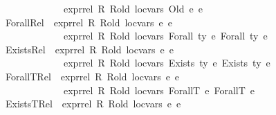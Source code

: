 \begin{isabellebody}
\ \ \ \ \ \ \ \ \ \ \ \ \ \ expr{\isacharunderscore}{\kern0pt}rel\ R\ R{\isacharunderscore}{\kern0pt}old\ loc{\isacharunderscore}{\kern0pt}vars\ {\isacharparenleft}{\kern0pt}Old\ e{}{\isacharparenright}{\kern0pt}\ e{}{\isachardoublequoteclose}\isanewline
\ {\isacharbar}{\kern0pt}\ Forall{\isacharunderscore}{\kern0pt}Rel{\isacharcolon}{\kern0pt}\ {\isachardoublequoteopen}{\isasymlbrakk}\ expr{\isacharunderscore}{\kern0pt}rel\ R\ R{\isacharunderscore}{\kern0pt}old\ loc{\isacharunderscore}{\kern0pt}vars\ e{}\ e{}\ {\isasymrbrakk}\ {\isasymLongrightarrow}\ \isanewline
\ \ \ \ \ \ \ \ \ \ \ \ \ \ expr{\isacharunderscore}{\kern0pt}rel\ R\ R{\isacharunderscore}{\kern0pt}old\ loc{\isacharunderscore}{\kern0pt}vars\ {\isacharparenleft}{\kern0pt}Forall\ ty\ e{}{\isacharparenright}{\kern0pt}\ {\isacharparenleft}{\kern0pt}Forall\ ty\ e{}{\isacharparenright}{\kern0pt}{\isachardoublequoteclose}\isanewline
\ {\isacharbar}{\kern0pt}\ Exists{\isacharunderscore}{\kern0pt}Rel{\isacharcolon}{\kern0pt}\ {\isachardoublequoteopen}{\isasymlbrakk}\ expr{\isacharunderscore}{\kern0pt}rel\ R\ R{\isacharunderscore}{\kern0pt}old\ loc{\isacharunderscore}{\kern0pt}vars\ e{}\ e{}\ {\isasymrbrakk}\ {\isasymLongrightarrow}\ \isanewline
\ \ \ \ \ \ \ \ \ \ \ \ \ \ expr{\isacharunderscore}{\kern0pt}rel\ R\ R{\isacharunderscore}{\kern0pt}old\ loc{\isacharunderscore}{\kern0pt}vars\ {\isacharparenleft}{\kern0pt}Exists\ ty\ e{}{\isacharparenright}{\kern0pt}\ {\isacharparenleft}{\kern0pt}Exists\ ty\ e{}{\isacharparenright}{\kern0pt}{\isachardoublequoteclose}\isanewline
\ {\isacharbar}{\kern0pt}\ ForallT{\isacharunderscore}{\kern0pt}Rel{\isacharcolon}{\kern0pt}\ {\isachardoublequoteopen}{\isasymlbrakk}\ expr{\isacharunderscore}{\kern0pt}rel\ R\ R{\isacharunderscore}{\kern0pt}old\ loc{\isacharunderscore}{\kern0pt}vars\ e{}\ e{}\ {\isasymrbrakk}\ {\isasymLongrightarrow}\ \isanewline
\ \ \ \ \ \ \ \ \ \ \ \ \ \ expr{\isacharunderscore}{\kern0pt}rel\ R\ R{\isacharunderscore}{\kern0pt}old\ loc{\isacharunderscore}{\kern0pt}vars\ {\isacharparenleft}{\kern0pt}ForallT\ e{}{\isacharparenright}{\kern0pt}\ {\isacharparenleft}{\kern0pt}ForallT\ e{}{\isacharparenright}{\kern0pt}{\isachardoublequoteclose}\isanewline
\ {\isacharbar}{\kern0pt}\ ExistsT{\isacharunderscore}{\kern0pt}Rel{\isacharcolon}{\kern0pt}\ {\isachardoublequoteopen}{\isasymlbrakk}\ expr{\isacharunderscore}{\kern0pt}rel\ R\ R{\isacharunderscore}{\kern0pt}old\ loc{\isacharunderscore}{\kern0pt}vars\ e{}\ e{}\ {\isasymrbrakk}\ {\isasymLongrightarrow}\ \isanewline

\end{isabellebody}
